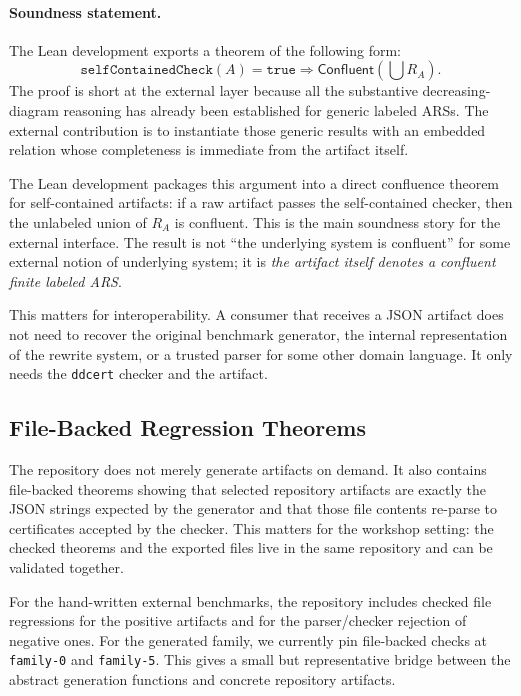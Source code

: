 \documentclass[submission,copyright,creativecommons]{eptcs}
\newcommand{\lean}{Lean\xspace}
\newcommand{\ddcert}{\texttt{ddcert}\xspace}
\newcommand{\family}[1]{\texttt{family-#1}}
\begin{document}
\paragraph{Soundness statement.}
The \lean development exports a theorem of the following form:
\[
  \texttt{selfContainedCheck}(A) = \texttt{true}
  \Longrightarrow
  \textsf{Confluent}(\bigcup R_A).
\]
The proof is short at the external layer because all the substantive
decreasing-diagram reasoning has already been established for generic labeled
ARSs. The external contribution is to instantiate those generic results with an
embedded relation whose completeness is immediate from the artifact itself.

The \lean development packages this argument into a direct confluence theorem
for self-contained artifacts: if a raw artifact passes the self-contained
checker, then the unlabeled union of $R_A$ is confluent. This is the main soundness
story for the external interface. The result is not ``the underlying system is
confluent'' for some external notion of underlying system; it is \emph{the
artifact itself denotes a confluent finite labeled ARS}.

This matters for interoperability. A consumer that receives a JSON artifact does
not need to recover the original benchmark generator, the internal
representation of the rewrite system, or a trusted parser for some other domain
language. It only needs the \ddcert checker and the artifact.

\subsection{File-Backed Regression Theorems}

The repository does not merely generate artifacts on demand. It also contains
file-backed theorems showing that selected repository artifacts are exactly the
JSON strings expected by the generator and that those file contents re-parse to
certificates accepted by the checker. This matters for the workshop setting:
the checked theorems and the exported files live in the same repository and can
be validated together.

For the hand-written external benchmarks, the repository includes checked file
regressions for the positive artifacts and for the parser/checker rejection of
negative ones. For the generated family, we currently pin file-backed checks at
\family{0} and \family{5}. This gives a small but representative bridge between
the abstract generation functions and concrete repository artifacts.
\end{document}
